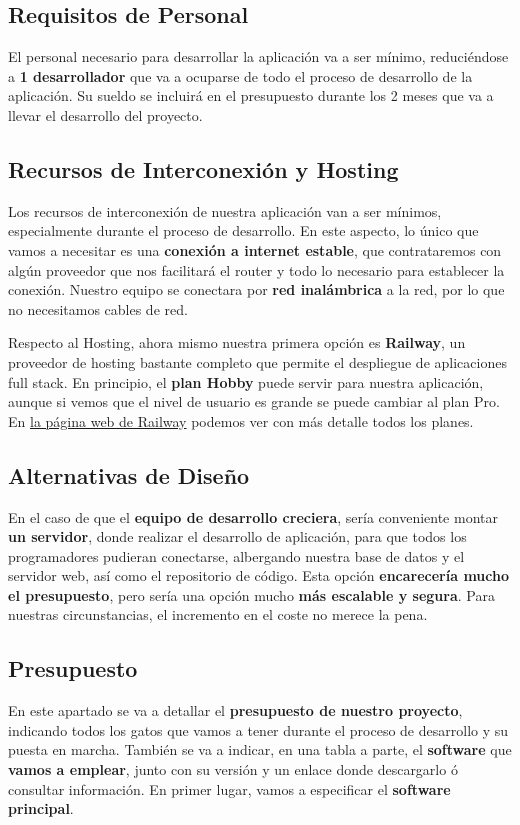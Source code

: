 \subsection{Requisitos de Personal}
El personal necesario para desarrollar la aplicación va a ser mínimo, reduciéndose a \textbf{1 desarrollador} que va a ocuparse de todo el proceso de desarrollo de la aplicación. Su sueldo se incluirá en el presupuesto durante los 2 meses que va a llevar el desarrollo del proyecto.

\subsection{Recursos de Interconexión y Hosting}
Los recursos de interconexión de nuestra aplicación van a ser mínimos, especialmente durante el proceso de desarrollo. En este aspecto, lo único que vamos a necesitar es una \textbf{conexión a internet estable}, que contrataremos con algún proveedor que nos facilitará el router y todo lo necesario para establecer la conexión. Nuestro equipo se conectara por \textbf{red inalámbrica} a la red, por lo que no necesitamos cables de red.

Respecto al \gls{Hosting}, ahora mismo nuestra primera opción es\textbf{ Railway}, un proveedor de hosting bastante completo que permite el despliegue de aplicaciones full stack. En principio, el \textbf{plan Hobby} puede servir para nuestra aplicación, aunque si vemos que el nivel de usuario es grande se puede cambiar al plan Pro. En \href{https://railway.com/}{la página web de Railway} podemos ver con más detalle todos los planes.

\subsection{Alternativas de Diseño}
En el caso de que el \textbf{equipo de desarrollo creciera}, sería conveniente montar \textbf{un servidor}, donde realizar el desarrollo de aplicación, para que todos los programadores pudieran conectarse, albergando nuestra base de datos y el servidor web, así como el repositorio de código. Esta opción \textbf{encarecería mucho el presupuesto}, pero sería una opción mucho \textbf{más escalable y segura}. Para nuestras circunstancias, el incremento en el coste no merece la pena.

\subsection{Presupuesto}
En este apartado se va a detallar el \textbf{presupuesto de nuestro proyecto}, indicando todos los gatos que vamos a tener durante el proceso de desarrollo y su puesta en marcha. También se va a indicar, en una tabla a parte, el \textbf{software} que \textbf{vamos a emplear}, junto con su versión y un enlace donde descargarlo ó consultar información. En primer lugar, vamos a especificar el \textbf{software principal}.

